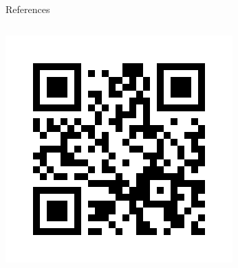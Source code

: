 \begin{frame}[fragile]{References}
\begin{columns}[t]
\begin{column}[T]{5cm}
\begin{center}
              \includegraphics[width=\textwidth]{sources/images/report_2010_2011.png}
             \end{center}
         \end{column}
     \end{columns}
\end{frame}
